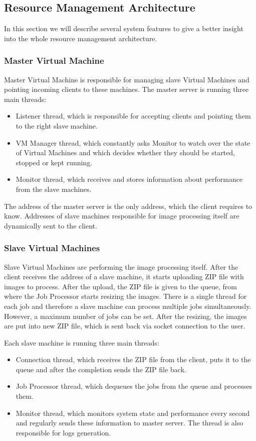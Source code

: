 \subsection{Resource Management Architecture}

In this section we will describe several system features to give a better insight into the whole resource management architecture.

\subsubsection{Master Virtual Machine}
Master Virtual Machine is responsible for managing slave Virtual Machines and pointing incoming clients to these machines. The master server is running three main threads:
\begin{itemize}
 \item Listener thread, which is responsible for accepting clients and pointing them to the right slave machine.
 \item VM Manager thread, which constantly asks Monitor to watch over the state of Virtual Machines and which decides whether they should be started, stopped or kept running.
 \item Monitor thread, which receives and stores information about performance from the slave machines.
\end{itemize}

The address of the master server is the only address, which the client requires to know. Addresses of slave machines responsible for image processing itself are dynamically sent to the client.

\subsubsection{Slave Virtual Machines}
Slave Virtual Machines are performing the image processing itself. After the client receives the address of a slave machine, it starts uploading ZIP file with images to process. After the upload, the ZIP file is given to the queue, from where the Job Processor starts resizing the images. There is a single thread for each job and therefore a slave machine can process multiple jobs simultaneously. However, a maximum number of jobs can be set. %
After the resizing, the images are put into new ZIP file, which is sent back via socket connection to the user.

Each slave machine is running three main threads:
\begin{itemize}
 \item Connection thread, which receives the ZIP file from the client, puts it to the queue and after the completion sends the ZIP file back.
 \item Job Processor thread, which dequeues the jobs from the queue and processes them.
 \item Monitor thread, which monitors system state and performance every second and regularly sends these information to master server. The thread is also responsible for logs generation.
\end{itemize}

